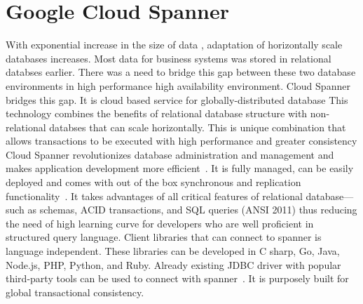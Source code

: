 \section{Google Cloud Spanner}

With exponential increase in the size of data , adaptation of horizontally 
scale databases increases. Most data for business systems was stored in relational
databses earlier. There was a need to bridge this gap between these two database
environments in high performance high availability environment. Cloud Spanner 
bridges this gap. It is cloud based service for globally-distributed database 
This technology combines the benefits of relational database structure 
with non-relational databses that can scale horizontally. This is unique combination 
that allows transactions to be executed with high performance and greater consistency 
Cloud Spanner revolutionizes database administration and management and makes 
application development more efficient~\cite{hid-sp18-523-www-google-spanner}.
It is fully managed, can be easily deployed and comes with out of the box
synchronous and replication functionality~\cite{hid-sp18-523-www-google-spanner}. 
It takes advantages of all critical features of relational database—such 
as schemas, ACID transactions, and SQL queries (ANSI 2011) thus reducing 
the need of high learning curve for developers who are well proficient in 
structured query language. 
Client libraries that can connect to spanner is language independent. 
These libraries can be developed in C sharp, Go, Java, Node.js, PHP, Python, 
and Ruby. Already existing JDBC driver with popular third-party tools can be 
used to connect with spanner~\cite{hid-sp18-523-www-google-spanner}. It is 
purposely built for global transactional consistency.
